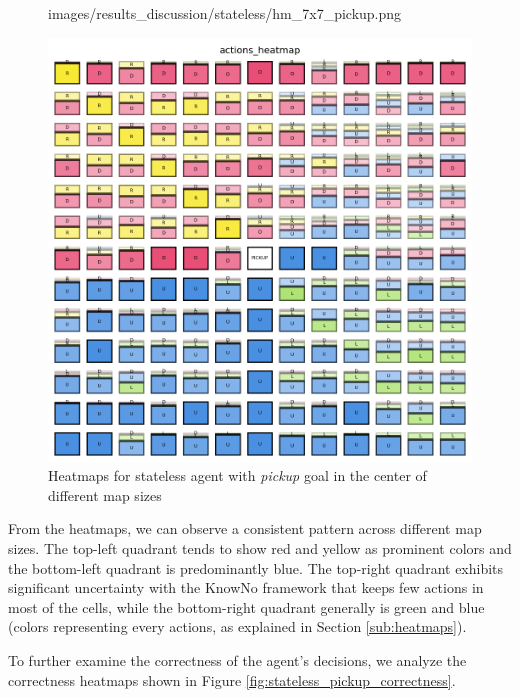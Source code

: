 \begin{figure}[ht]
\begin{minipage}[b]{0.32\textwidth}
{      images/results_discussion/stateless/hm_7x7_pickup.png
    }
    \caption{$7 \times 7$}
    \label{fig:hm_7x7_pickup}
  \end{minipage}
  \hfill
  \begin{minipage}[b]{0.32\textwidth}
    \centering
    \includegraphics[width=\textwidth]{
      images/results_discussion/stateless/hm_13x13_pickup.png
    }
    \caption{$13 \times 13$}
    \label{fig:hm_13x13_pickup}
  \end{minipage}
  \caption{Heatmaps for stateless agent with \emph{pickup} goal in the center of
  different map sizes}
  \label{fig:stateless_pickup_heatmaps}
\end{figure}
\vspace{5mm}

From the heatmaps, we can observe a consistent pattern across different map
sizes. The top-left quadrant tends to show red and yellow as prominent colors and
the bottom-left quadrant is predominantly blue. The top-right quadrant exhibits
significant uncertainty with the KnowNo framework that keeps few actions in most
of the cells, while the bottom-right quadrant generally is green and blue (colors
representing every actions, as explained in Section \ref{sub:heatmaps}).

To further examine the correctness of the agent's decisions, we analyze the correctness
heatmaps shown in Figure \ref{fig:stateless_pickup_correctness}.


